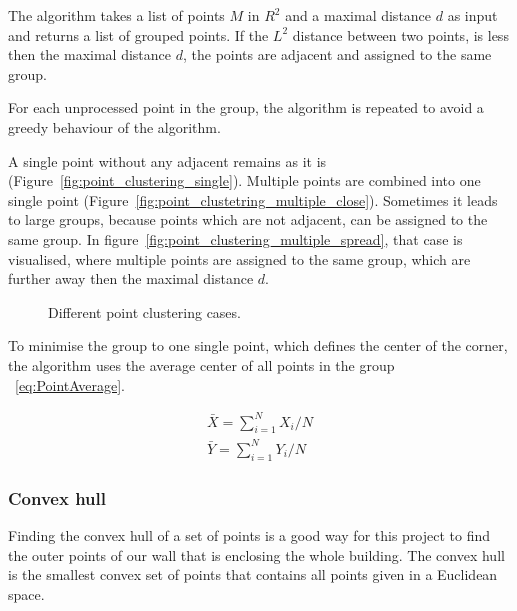 The algorithm takes a list of points $M$ in $R^2$ and a maximal distance $d$ as input and returns a list of grouped points. If the $L^2$ distance between two points, is less then the maximal distance $d$, the points are adjacent and assigned to the same group.

For each unprocessed point in the group, the algorithm is repeated to avoid a greedy behaviour of the algorithm.

A single point without any adjacent remains as it is (Figure~\ref{fig:point_clustering_single}). Multiple points are combined into one single point (Figure~\ref{fig:point_clustetring_multiple_close}). Sometimes it leads to large groups, because points which are not adjacent, can be assigned to the same group. In figure~\ref{fig:point_clustering_multiple_spread}, that case is visualised, where multiple points are assigned to the same group, which are further away then the maximal distance $d$.

\begin{figure}[h!]
	\centering
	\hfill
	\hfill
	\caption{Different point clustering cases.}
	\label{fig:PointClusteringCases}
\end{figure}

To minimise the group to one single point, which defines the center of the corner, the algorithm uses the average center of all points in the group ~\eqref{eq:PointAverage}.


\begin{equation} \label{eq:PointAverage}
\begin{gathered}
\bar{X} = \sum_{i=1}^{N}X_{i}/N
\\
\bar{Y} = \sum_{i=1}^{N}Y_{i}/N
\end{gathered}
\end{equation}


\subsubsection{Convex hull}
Finding the convex hull of a set of points is a good way for this project to find the outer points of our wall that is enclosing the whole building. The convex hull is the smallest convex set of points that contains all points given in a Euclidean space.

